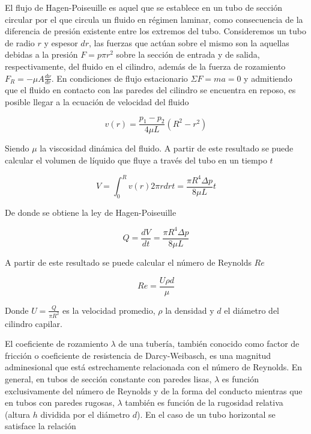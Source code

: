 El flujo de Hagen-Poiseuille es aquel que se establece en un tubo de sección circular por el que circula un fluido en régimen laminar, como consecuencia de la diferencia de presión existente entre los extremos del tubo. Consideremos un tubo de radio $r$ y espesor $dr$, las fuerzas que actúan sobre el mismo son la aquellas debidas a la presión $F=p\pi r^2$ sobre la sección de entrada y de salida, respectivamente, del fluido en el cilindro, además de la fuerza de rozamiento $F_R = -\mu A \frac{d\nu}{dr}$. En condiciones de flujo estacionario $\Sigma F = ma=  0$ y admitiendo que el fluido en contacto con las paredes del cilindro se encuentra en reposo, es posible llegar a la ecuación de velocidad del fluido

\begin{equation}
	v(r) = \frac{p_1 - p_2}{4\mu L} \left( R^2 - r^2 \right)
\end{equation}

Siendo $\mu$ la viscosidad dinámica del fluido. A partir de este resultado se puede calcular el volumen de líquido que fluye a través del tubo en un tiempo $t$

\begin{equation}
	V = \int_{0}^{R} v(r) 2\pi r dr t = \frac{\pi R^4 \Delta p}{8\mu L}t
\end{equation}

De donde se obtiene la ley de Hagen-Poiseuille

\begin{equation}
	Q = \frac{dV}{dt} = \frac{\pi R^4 \Delta p}{8\mu L} \label{eq_caudal}
\end{equation}

A partir de este resultado se puede calcular el número de Reynolds $Re$

\begin{equation}
	Re = \frac{U\rho d}{\mu} \label{eq_reynolds}
\end{equation}

Donde $U = \frac{Q}{\pi R^2}$ es la velocidad promedio, $\rho$ la densidad y $d$ el diámetro del cilindro capilar.

El coeficiente de rozamiento $\lambda$ de una tubería, también conocido como factor de fricción o coeficiente de resistencia de Darcy-Weibasch, es una magnitud adminesional que está estrechamente relacionada con el número de Reynolds. En general, en tubos de sección constante con paredes lisas, $\lambda$ es función exclusivamente del número de Reynolds y de la forma del conducto mientras que en tubos con paredes rugosas, $\lambda$ también es función de la rugosidad relativa (altura $h$ dividida por el diámetro $d$). En el caso de un tubo horizontal se satisface la relación

